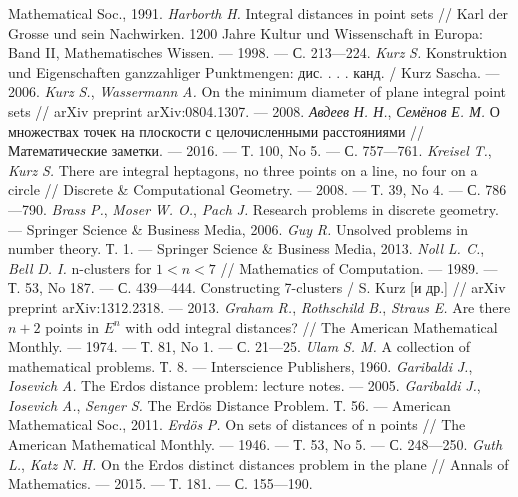 \begin{thebibliography}{99}
Mathematical Soc., 1991.
\textsl{Harborth} \textsl{H.} Integral distances in point sets /\!/
Karl der Grosse und sein Nachwirken. 1200 Jahre Kultur und
Wissenschaft in Europa: Band II, Mathematisches Wissen. ---
1998. --- С. 213---224.
\textsl{Kurz} \textsl{S.} Konstruktion und Eigenschaften
ganzzahliger Punktmengen: дис. . . . канд. / Kurz Sascha. --- 2006.
\textsl{Kurz} \textsl{S.}, \textsl{Wassermann} \textsl{A.} On
the minimum diameter of plane integral point sets /\!/ arXiv
preprint arXiv:0804.1307. --- 2008.
\textsl{Авдеев} \textsl{Н. Н.}, \textsl{Семёнов} \textsl{Е. М.}
О множествах точек на плоскости с целочисленными
расстояниями /\!/ Математические заметки. --- 2016. --- Т. 100,
No 5. --- С. 757---761.
\textsl{Kreisel} \textsl{T.}, \textsl{Kurz} \textsl{S.} There are
integral heptagons, no three points on a line, no four on a circle /\!/
Discrete \& Computational Geometry. --- 2008. --- Т. 39, No 4. ---
С. 786---790.
\textsl{Brass} \textsl{P.}, \textsl{Moser} \textsl{W. O.},
\textsl{Pach} \textsl{J.} Research problems in discrete
geometry. --- Springer Science \& Business Media, 2006.
\textsl{Guy} \textsl{R.} Unsolved problems in number theory. Т.
1. --- Springer Science \& Business Media, 2013.
\textsl{Noll} \textsl{L. C.}, \textsl{Bell} \textsl{D. I.} n-clusters
for $1 < n < 7$ /\!/ Mathematics of Computation. --- 1989. --- Т. 53,
No 187. --- С. 439---444.
Constructing 7-clusters / S. Kurz [и др.] /\!/ arXiv preprint
arXiv:1312.2318. --- 2013.
\textsl{Graham} \textsl{R.}, \textsl{Rothschild} \textsl{B.},
\textsl{Straus} \textsl{E.} Are there $n + 2$ points in $E^n$ with odd
integral distances? /\!/ The American Mathematical Monthly. ---
1974. --- Т. 81, No 1. --- С. 21---25.
\textsl{Ulam} \textsl{S. M.} A collection of mathematical
problems. Т. 8. --- Interscience Publishers, 1960.
\textsl{Garibaldi} \textsl{J.}, \textsl{Iosevich} \textsl{A.} The
Erdos distance problem: lecture notes. --- 2005.
\textsl{Garibaldi} \textsl{J.}, \textsl{Iosevich} \textsl{A.},
\textsl{Senger} \textsl{S.} The Erd\"{o}s Distance Problem. Т. 56. ---
American Mathematical Soc., 2011.
\textsl{Erd\"{o}s} \textsl{P.} On sets of distances of n points /\!/
The American Mathematical Monthly. --- 1946. --- Т. 53, No 5. ---
С. 248---250.
\textsl{Guth} \textsl{L.}, \textsl{Katz} \textsl{N. H.} On the
Erdos distinct distances problem in the plane /\!/ Annals of
Mathematics. --- 2015. --- Т. 181. --- С. 155---190.
\end{thebibliography}
